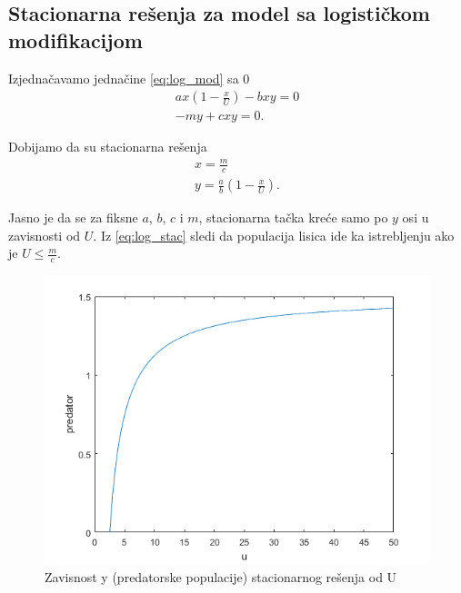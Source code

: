 \documentclass[a4paper]{article}
\begin{document}
\subsection{Stacionarna rešenja za model sa logističkom modifikacijom}

Izjednačavamo jednačine \eqref{eq:log_mod} sa 0
\begin{displaymath}
    \begin{aligned}
        ax(1 - \frac{x}{U}) - bxy = 0\\
        -my + cxy = 0.
    \end{aligned}
\end{displaymath}

Dobijamo da su stacionarna rešenja
\begin{equation}
    \label{eq:log_stac}
    \begin{aligned}
        x = \frac{m}{c}\\
        y = \frac{a}{b}(1 - \frac{x}{U}).
    \end{aligned}
\end{equation}

Jasno je da se za fiksne $a$, $b$, $c$ i $m$,
stacionarna tačka kreće samo po $y$ osi u zavisnosti od $U$.
Iz \eqref{eq:log_stac} sledi da populacija lisica ide ka istrebljenju ako je $U\leq\frac{m}{c}$.

\begin{figure}[H]
    \centering
    \begin{minipage}{0.75\textwidth}
        \centering
        \includegraphics[width=1\textwidth]{images/predator_vs_u} %
        \caption{Zavisnost y (predatorske populacije) stacionarnog rešenja od U}
    \end{minipage}
\end{figure}
\end{document}
